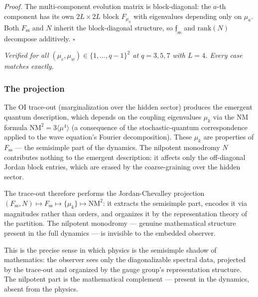 \documentclass[
  11pt,
]{article}
\begin{document}
\emph{Proof.} The multi-component evolution matrix is block-diagonal:
the \(a\)-th component has its own \(2L \times 2L\) block \(F_{\mu_a}\)
with eigenvalues depending only on \(\mu_a\). Both \(F_{\mathrm{ss}}\)
and \(N\) inherit the block-diagonal structure, so
\(\mathfrak{f}_{\mathrm{ss}}\) and \(\mathrm{rank}(N)\) decompose
additively. \(\square\)

\emph{Verified for all \((\mu_c, \mu_w) \in \{1, \ldots, q-1\}^2\) at
\(q = 3, 5, 7\) with \(L = 4\). Every case matches exactly.}

\hypertarget{the-projection}{%
\subsubsection{The projection}\label{the-projection}}

The OI trace-out (marginalization over the hidden sector) produces the
emergent quantum description, which depends on the coupling eigenvalues
\(\mu_k\) via the NM formula \(\mathrm{NM}^2 = 3\langle\mu^4\rangle\) (a
consequence of the stochastic-quantum correspondence applied to the wave
equation's Fourier decomposition). These \(\mu_k\) are properties of
\(F_{\mathrm{ss}}\) --- the semisimple part of the dynamics. The
nilpotent monodromy \(N\) contributes nothing to the emergent
description: it affects only the off-diagonal Jordan block entries,
which are erased by the coarse-graining over the hidden sector.

The trace-out therefore performs the Jordan-Chevalley projection
\((F_{\mathrm{ss}}, N) \mapsto F_{\mathrm{ss}} \mapsto \{\mu_k\} \mapsto \mathrm{NM}^2\):
it extracts the semisimple part, encodes it via magnitudes rather than
orders, and organizes it by the representation theory of the partition.
The nilpotent monodromy --- genuine mathematical structure present in
the full dynamics --- is invisible to the embedded observer.

This is the precise sense in which physics is the semisimple shadow of
mathematics: the observer sees only the diagonalizable spectral data,
projected by the trace-out and organized by the gauge group's
representation structure. The nilpotent part is the mathematical
complement --- present in the dynamics, absent from the physics.
\end{document}
